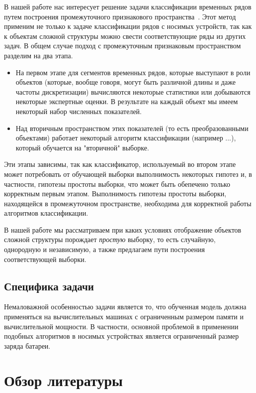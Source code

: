 \documentclass[12pt, fleqn, unicode]{article}
\begin{document}
В нашей работе нас интересует решение задачи классификации временных
рядов путем построения промежуточного признакового пространства~\cite{Kuznetsov2015}. Этот метод
применим не только к задаче классификации рядов с носимых устройств,
так как к объектам сложной структуры можно свести соответствующие ряды из других задач.
В общем случае подход с промежуточным признаковым пространством разделим на два этапа.

\begin{itemize}
    \item На первом этапе для сегментов временных рядов, которые выступают
    в роли объектов (которые, вообще говоря, могут
    быть различной длины и даже частоты дискретизации) вычисляются некоторые статистики
    или добываются некоторые экспертные оценки. В результате на каждый объект
    мы имеем некоторый набор численных показателей.
    \item Над вторичным пространством этих показателей (то есть преобразованными
    объектами) работает некоторый алгоритм классификации (например ...), который
    обучается на "вторичной" выборке.
\end{itemize}

Эти этапы зависимы, так как классификатор, используемый во втором этапе может
потребовать от обучающей выборки выполнимость некоторых гипотез и, в частности,
гипотезы простоты выборки, что может быть обепечено
только корректным первым этапом. Выполнимость гипотезы простоты выборки,
находящейся в промежуточном пространстве, необходима для корректной работы алгоритмов
классификации.

В нашей работе мы рассматриваем при каких условиях отображение объектов сложной структуры
порождает \textit{простую} выборку, то есть случайную, однородную и независимую,
а также предлагаем пути построения соответствующей выборки.

\subsection{Специфика задачи}

Немаловажной особенностью задачи является то, что обученная модель должна применяться
на вычислительных машинах с ограниченным размером памяти и вычислительной мощности.
В частности, основной проблемой в применении подобных алгоритмов в носимых
устройствах является ограниченный размер заряда батареи.

\newpage
\section{Обзор литературы}
\end{document}
